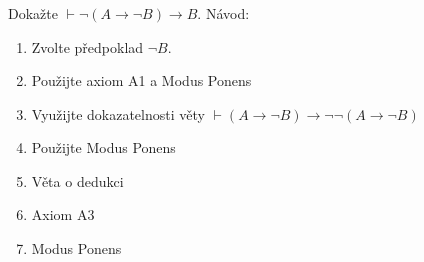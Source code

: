 \subsubsection{}
Dokažte $\vdash \neg (A \rightarrow \neg B ) \rightarrow B$.
Návod:
\begin{enumerate}[1)]
	\item Zvolte předpoklad $\neg B$.
	\item Použijte axiom A1 a Modus Ponens
	\item Využijte dokazatelnosti věty $\vdash (A \rightarrow \neg B) \rightarrow \neg \neg (A \rightarrow \neg B)$
	\item Použijte Modus Ponens
	\item Věta o dedukci
	\item Axiom A3
	\item Modus Ponens
\end{enumerate}
